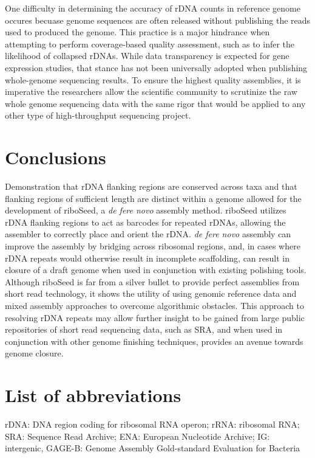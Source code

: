 \documentclass[10pt]{article}
\begin{document}
\begin{linenumbers}
One difficulty in determining the accuracy of rDNA counts in reference genome occures becuase genome sequences are often released without publishing the reads used to produced the genome. This practice is a major hindrance when attempting to perform coverage-based quality assessment, such as to infer the likelihood of collapsed rDNAs. While data transparency is expected for gene expression studies, that stance has not been universally adopted when publishing whole-genome sequencing results. To ensure the highest quality assemblies, it is imperative the researchers allow the scientific community to scrutinize the raw whole genome sequencing data with the same rigor that would be applied to any other type of high-throughput sequencing project.



\section*{Conclusions}
Demonstration that rDNA flanking regions are conserved across taxa and that flanking regions of sufficient length are distinct within a genome allowed for the development of riboSeed, a \textit{de fere novo} assembly method. riboSeed  utilizes rDNA flanking regions to act as barcodes for repeated rDNAs, allowing the assembler to correctly place and orient the rDNA. \textit{de fere novo} assembly can improve the assembly by bridging across ribosomal regions, and, in cases where rDNA repeats would otherwise result in incomplete scaffolding, can result in closure of a draft genome when used in conjunction with existing polishing tools. Although riboSeed is far from a silver bullet to provide perfect assemblies from short read technology, it shows the utility of using genomic reference data and mixed assembly approaches to overcome algorithmic obstacles. This approach to resolving rDNA repeats may allow further insight to be gained from large public repositories of short read sequencing data, such as SRA, and when used in conjunction with other genome finishing techniques, provides an avenue towards genome closure.

\end{linenumbers}
\baselineskip13pt

\section*{List of abbreviations}
rDNA: DNA region coding for ribosomal RNA operon; rRNA: ribosomal RNA; SRA: Sequence Read Archive; ENA: European Nucleotide Archive; IG: intergenic, GAGE-B: Genome Assembly Gold-standard Evaluation for Bacteria
\end{document}

